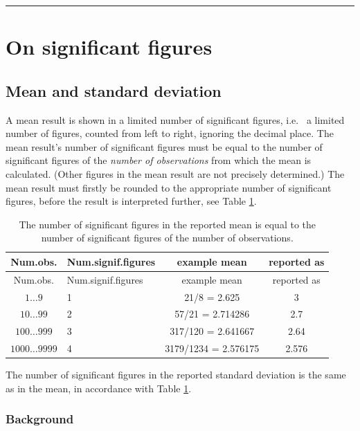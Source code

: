 \documentclass[
]{book}
\begin{document}
\begin{center}\rule{0.5\linewidth}{0.5pt}\end{center}

\section{On significant figures}\label{sec:significantfigures}

\subsection{Mean and standard deviation}\label{sec:significantfigures-means}

A mean result is shown in a limited number of significant figures, i.e.~
a limited number of figures, counted from left to right, ignoring the decimal place.
The mean result's number of significant figures must be equal to the
number of significant figures of the \emph{number of observations} from which the
mean is calculated. (Other figures in the mean result are not precisely
determined.) The mean result must firstly be rounded to the
appropriate number of significant figures, before the result is interpreted
further, see
Table \ref{tab:signiffiguresmean}.

\begin{longtable}[]{@{}clcc@{}}
\caption{\label{tab:signiffiguresmean} The number of significant figures in the reported mean is
equal to the number of significant figures of the number of observations.}\tabularnewline
\toprule\noalign{}
Num.obs. & Num.signif.figures & example mean & reported as \\
\midrule\noalign{}
\endfirsthead
\toprule\noalign{}
Num.obs. & Num.signif.figures & example mean & reported as \\
\midrule\noalign{}
\endhead
\bottomrule\noalign{}
\endlastfoot
\(1\dots9\) & 1 & 21/8 = 2.625 & 3 \\
\(10\dots99\) & 2 & 57/21 = 2.714286 & 2.7 \\
\(100\dots999\) & 3 & 317/120 = 2.641667 & 2.64 \\
\(1000\dots9999\) & 4 & 3179/1234 = 2.576175 & 2.576 \\
\end{longtable}

The number of significant figures in the reported standard deviation is
the same as in the mean, in accordance with
Table \ref{tab:signiffiguresmean}.

\subsubsection{Background}\label{background}
\end{document}
